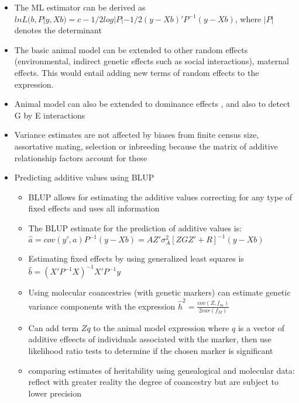 \documentclass[12pt]{amsart}
\begin{document}
\begin{itemize}
\item The ML estimator can be derived as $lnL(b, P | y, Xb) = c - 1/2log|P| - 1/2(y-Xb)'P^{-1}(y-Xb)$, where $|P|$ denotes the determinant 
\item The basic animal model can be extended to other random effects (environmental, indirect genetic effects such as social interactions), maternal effects. This would entail adding new terms of random effects to the expression.
\item Animal model can also be extended to dominance effects , and also to detect G by E interactions 
\item Variance estimates are not affected by biases from finite census size, assortative mating, selection or inbreeding because the matrix of additive relationship factors account for these 
\item Predicting additive values using BLUP
\begin{itemize}
\item BLUP allows for estimating the additive values correcting for any type of fixed effects and uses all information 
\item The BLUP estimate for the prediction of additive values is: $\hat{a} = cov(y',a)P^{-1}(y-Xb) = AZ'\sigma^2_A[ZGZ' + R]^{-1}(y-Xb)$
\item Estimating fixed effects by using generalized least squares is $\hat{b} = (X'P^{-1}X)^{-1}X'P^{-1}y$
\item Using molecular coancestries (with genetic markers) can estimate genetic variance components  with the expression $\hat{h}^2 = \frac{cov(Z,f_m)}{2var(f_M)}$
\item Can add term $Zq$ to the animal model expression where $q$ is a vector of additive effeects of individuals associated with the marker, then use likelihood ratio tests to determine if the chosen marker is significant
\item comparing estimates of heritability using genealogical and molecular data: reflect with greater reality the degree of coancestry but are subject to lower precision
\end{itemize}
\end{itemize}
\end{document}
